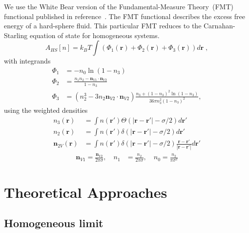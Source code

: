 \documentclass[letterpaper,twocolumn,amsmath,amssymb,jcp,10pt,aip]{revtex4-1}
\newcommand{\rr}{\textbf{r}}
\begin{document}
We use the White Bear version of the Fundamental-Measure Theory~(FMT)
functional published in reference~\cite{roth2002whitebear}.  The FMT
functional describes the excess free energy of a hard-sphere fluid.
This particular FMT reduces to the Carnahan-Starling equation of state
for homogeneous systems.
\begin{equation}
A_\textit{HS}[n] = k_B T \int \left(\Phi_1(\rr) + \Phi_2(\rr) + \Phi_3(\rr)\right) d\rr \; ,
\end{equation}
with integrands
\begin{align}
\Phi_1 &= -n_0 \ln\left( 1 - n_3\right)\\
\Phi_2 &= \frac{n_1 n_2 - \mathbf{n}_{V1} \cdot\mathbf{n}_{V2}}{1-n_3} \\
\Phi_3 &= (n_2^3 - 3 n_2 \mathbf{n}_{V2} \cdot \mathbf{n}_{V2}) \frac{
  n_3 + (1-n_3)^2 \ln(1-n_3)
}{
  36\pi n_3^2\left( 1 - n_3 \right)^2
} ,
\end{align}
using the weighted densities
\begin{align}
  n_3(\rr) &= \int n(\rr') \Theta(\left|\rr - \rr'\right| - \sigma/2)
  d\rr' \label{eq:FMn3} \\
  n_2(\rr) &= \int n(\rr') \delta(\left|\rr - \rr'\right| - \sigma/2) d\rr' \\
  \mathbf{n}_{2V}(\rr) &= \int n(\rr') \delta(\left|\rr - \rr'\right| - \sigma/2) \frac{\rr-\rr'}{|\rr-\rr'|}d\rr'
\end{align}
\begin{align}
  \mathbf{n}_{V1} = \frac{\mathbf{n}_{V2}}{2\pi \sigma}, \quad
  n_1 &= \frac{n_2}{2\pi \sigma} , \quad
  n_0 = \frac{n_2}{\pi \sigma^2} \label{eq:FMrest}
\end{align}


\section{Theoretical Approaches}

\subsection{Homogeneous limit}
\end{document}
